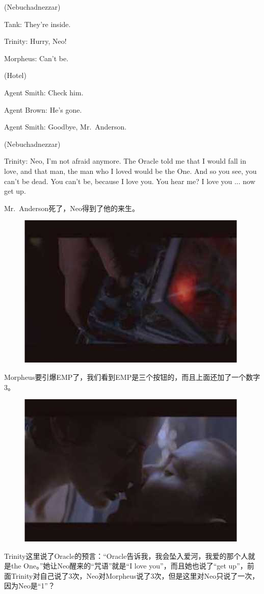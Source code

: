 \documentclass{ctexart}
\newenvironment{myquote}{\color{green} \setlength{\leftskip}{6em} \setlength{\rightskip}{4em} \setlength{\parindent}{-2em}}{\par}
\begin{document}
\begin{myquote}
(Nebuchadnezzar)

Tank: They're inside.

Trinity: Hurry, Neo!

Morpheus: Can't be.

(Hotel)

Agent Smith: Check him.

Agent Brown: He's gone.

Agent Smith: Goodbye, Mr.~Anderson.

(Nebuchadnezzar)

Trinity: Neo, I'm not afraid anymore. The Oracle told me that I would fall in love, and that man, the man who I loved would be the One. And so you see, you can't be dead. You can't be, because I love you. You hear me? I love you ... now get up.
\end{myquote}

Mr.~Anderson死了，Neo得到了他的来生。

\begin{figure}[htb]
\centering
\includegraphics[width=0.5\linewidth]{fig/read_Matrix-88}
\end{figure}

Morpheus要引爆EMP了，我们看到EMP是三个按钮的，而且上面还加了一个数字3。

\begin{figure}[htb]
\centering
\includegraphics[width=0.5\linewidth]{fig/read_Matrix-89}
\end{figure}

Trinity这里说了Oracle的预言：“Oracle告诉我，我会坠入爱河，我爱的那个人就是the One。”她让Neo醒来的“咒语”就是“I love you”，而且她也说了“get up”，前面Trinity对自己说了3次，Neo对Morpheus说了3次，但是这里对Neo只说了一次，因为Neo是“1”？
\end{document}
